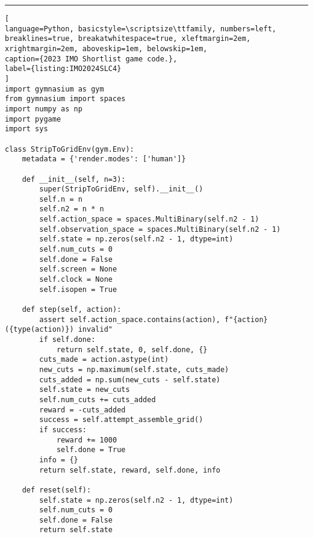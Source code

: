 \hrule
\begin{lstlisting}[
language=Python, basicstyle=\scriptsize\ttfamily, numbers=left, breaklines=true, breakatwhitespace=true, xleftmargin=2em, xrightmargin=2em, aboveskip=1em, belowskip=1em,
caption={2023 IMO Shortlist game code.},
label={listing:IMO2024SLC4}
]
import gymnasium as gym
from gymnasium import spaces
import numpy as np
import pygame
import sys

class StripToGridEnv(gym.Env):
    metadata = {'render.modes': ['human']}

    def __init__(self, n=3):
        super(StripToGridEnv, self).__init__()
        self.n = n
        self.n2 = n * n
        self.action_space = spaces.MultiBinary(self.n2 - 1)
        self.observation_space = spaces.MultiBinary(self.n2 - 1)
        self.state = np.zeros(self.n2 - 1, dtype=int)
        self.num_cuts = 0
        self.done = False
        self.screen = None
        self.clock = None
        self.isopen = True

    def step(self, action):
        assert self.action_space.contains(action), f"{action} ({type(action)}) invalid"
        if self.done:
            return self.state, 0, self.done, {}
        cuts_made = action.astype(int)
        new_cuts = np.maximum(self.state, cuts_made)
        cuts_added = np.sum(new_cuts - self.state)
        self.state = new_cuts
        self.num_cuts += cuts_added
        reward = -cuts_added
        success = self.attempt_assemble_grid()
        if success:
            reward += 1000
            self.done = True
        info = {}
        return self.state, reward, self.done, info

    def reset(self):
        self.state = np.zeros(self.n2 - 1, dtype=int)
        self.num_cuts = 0
        self.done = False
        return self.state


\end{lstlisting}
